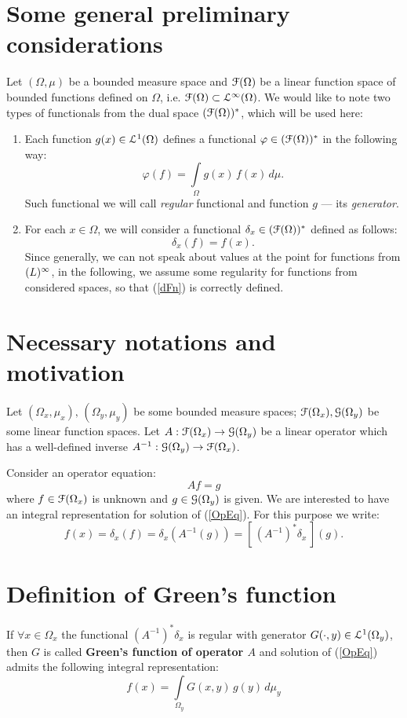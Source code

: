 \documentclass[12pt]{article}
\newcommand{\DSp}{(\EuScript{F}(\Omega))^*}
\newcommand{\FOx}{\EuScript{F}(\Omega_x)}
\newcommand{\GOy}{\EuScript{G}(\Omega_y)}
\begin{document}
\section*{Some general preliminary considerations}
Let $(\Omega,\mu)$ be a bounded measure space and $\EuScript{F}(\Omega)$ be a linear function
space of bounded functions defined on $\Omega$, i.e. $\EuScript{F}(\Omega)\subset\EuScript{L}^\infty(\Omega)$.
We would like to note two types of functionals from the dual space $\DSp$, which
will be used here:
\begin{enumerate}
\item Each function $g(x)\in\EuScript{L}^1(\Omega)$ defines a functional $\varphi\in\DSp$ in the
    following way:
    $$
        \varphi(f)=\int\limits_{\Omega} g(x)\,f(x)\,d\mu.
    $$
    Such functional we will call \textit{regular} functional and function $g$ --- its \textit{generator}.

\item For each $x\in\Omega$, we will consider a functional $\delta_x\in\DSp$ defined as follows:
    \begin{equation}\label{dFn}
        \delta_x(f)=f(x).
    \end{equation}
    Since generally, we can not speak about values at the point for functions from $\EuScript(L)^\infty$,
    in the following, we assume some regularity for functions from considered spaces, so that
    (\ref{dFn}) is correctly defined.

\end{enumerate}


\section*{Necessary notations and motivation}
Let $(\Omega_x,\mu_x),\,(\Omega_y,\mu_y)$ be some bounded measure spaces; $\FOx,\GOy$ be some
linear function spaces. Let $A:\FOx\rightarrow\GOy$ be a linear operator which has a well-defined
inverse $A^{-1}:\GOy\rightarrow\FOx$.

Consider an operator equation:
\begin{equation}\label{OpEq}
    Af=g
\end{equation}
where $f\in\FOx$ is unknown and $g\in\GOy$ is given. We are interested to have an integral representation
for solution of (\ref{OpEq}). For this purpose we write:
$$
    f(x)=\delta_x(f)=\delta_x(A^{-1}(g))=[\, (A^{-1})^*\delta_x \,](g).
$$

\section*{Definition of Green's function}
If $\forall x\in\Omega_x$ the functional $(A^{-1})^*\delta_x$ is regular with generator
$G(\cdot,y)\in\EuScript{L}^1(\Omega_y)$, then $G$ is called \textbf{Green's function of
operator $A$} and solution of (\ref{OpEq}) admits the following integral representation:
$$
    f(x)=\int\limits_{\Omega_y}G(x,y)\,g(y)\,d\mu_y
$$
\end{document}
